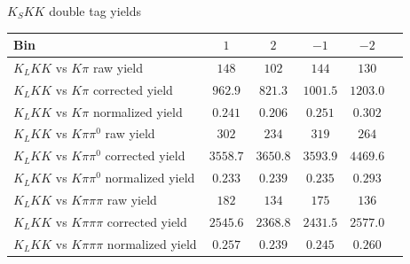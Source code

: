 \documentclass{beamer}
\begin{document}
\begin{frame}{$K_SKK$ double tag yields}
  \centering
  \def\arraystretch{1.2}%
  \begin{tabular}{l|ccccc}
    Bin                                        & $1$      & $2$      & $-1$     & $-2$ \\
    \hline
    $K_LKK$ vs $K\pi$ raw yield                & $148$    & $102$    & $144$    & $130$ \\
    $K_LKK$ vs $K\pi$ corrected yield          & $962.9$  & $821.3$  & $1001.5$ & $1203.0$ \\
    $K_LKK$ vs $K\pi$ normalized yield         & $0.241$  & $0.206$  & $0.251$  & $0.302$ \\
    \hline
    $K_LKK$ vs $K\pi\pi^0$ raw yield           & $302$    & $234$    & $319$    & $264$ \\
    $K_LKK$ vs $K\pi\pi^0$ corrected yield     & $3558.7$ & $3650.8$ & $3593.9$ & $4469.6$ \\
    $K_LKK$ vs $K\pi\pi^0$ normalized yield    & $0.233$  & $0.239$  & $0.235$  & $0.293$ \\
    \hline
    $K_LKK$ vs $K\pi\pi\pi$ raw yield          & $182$    & $134$    & $175$    & $136$ \\
    $K_LKK$ vs $K\pi\pi\pi$ corrected yield    & $2545.6$ & $2368.8$ & $2431.5$ & $2577.0$ \\
    $K_LKK$ vs $K\pi\pi\pi$ normalized yield   & $0.257$  & $0.239$  & $0.245$  & $0.260$ \\
    \hline
  \end{tabular}
\end{frame}
\end{document}
